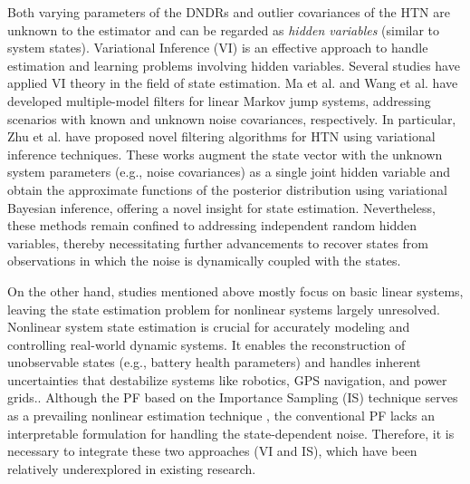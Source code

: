 \documentclass[10pt,twocolumn,twoside]{IEEEtran}
\begin{document}
Both varying parameters of the DNDRs and outlier covariances of the HTN are unknown to the estimator and can be regarded as {\it hidden variables} (similar to system states). Variational Inference (VI) is an effective approach to handle estimation and learning problems involving hidden variables\cite{blei2017variational,zhang2018advances}. Several studies have applied VI theory in the field of state estimation\cite{ma2018multiple,wang2019variational,zhu2021novel,zhu2021adaptive,zhu2021vb}.
Ma et al. \cite{ma2018multiple} and Wang et al. \cite{wang2019variational} have developed multiple-model filters for linear Markov jump systems, addressing scenarios with known and unknown noise covariances, respectively. In particular, Zhu et al. \cite{zhu2021novel,zhu2021adaptive} have proposed novel filtering algorithms for HTN using variational inference techniques. These works augment the state vector with the unknown system parameters (e.g., noise covariances) as a single joint hidden variable and obtain the approximate functions of the posterior distribution using variational Bayesian inference, offering a novel insight for state estimation. Nevertheless, these methods remain confined to addressing independent random hidden variables, thereby necessitating further advancements to recover states from observations in which the noise is dynamically coupled with the states.

On the other hand, studies mentioned above mostly focus on basic linear systems, leaving the state estimation problem for nonlinear systems largely unresolved. Nonlinear system state estimation is crucial for accurately modeling and controlling real-world dynamic systems. It enables the reconstruction of unobservable states (e.g., battery health parameters\cite{meng2017overview}) and handles inherent uncertainties that destabilize systems like robotics, GPS navigation, and power grids.\cite{chen2011kalman,hashim2023uwb,cheng2024survey}. Although the PF based on the Importance Sampling (IS) technique serves as a prevailing nonlinear estimation technique \cite{chen2003bayesian,doucet2009tutorial,schon2005marginalized}, the conventional PF lacks an interpretable formulation for handling the state-dependent noise. Therefore, it is necessary to integrate these two approaches (VI and IS), which have been relatively underexplored in existing research.
\end{document}
